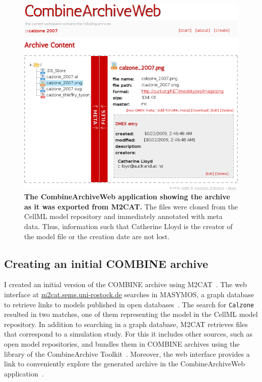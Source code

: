 \begin{figure}
\begin{center}
\includegraphics[width=.8\textwidth]{img/webcat-screenshot-combined.png}
\end{center}
\caption{\textbf{The CombineArchiveWeb application showing the archive as it was exported from M2CAT.} The files were cloned from the CellML model repository and immediately annotated with meta data. Thus, information such that Catherine Lloyd is the creator of the model file or the creation date are not lost.
}
\label{fig:screen:webcat}
\end{figure}

\subsection{Creating an initial COMBINE archive}

I created an initial version of the COMBINE archive using M2CAT~\cite{m2cat}.
The web interface at \href{http://m2cat.sems.uni-rostock.de/}{m2cat.sems.uni-rostock.de} searches in MASYMOS, a graph database to retrieve links to models published in open databases~\cite{masymos}.
The search for \texttt{Calzone} resulted in two matches, one of them representing the model in the CellML model repository.
In addition to searching in a graph database, M2CAT retrieves files that correspond to a simulation study.
For this it includes other sources, such as open model repositories, and bundles them in COMBINE archives using the library of the CombineArchive Toolkit~\cite{cat}.
Moreover, the web interface provides a link to conveniently explore the generated archive in the CombineArchiveWeb application~\cite{scharm2014}.

